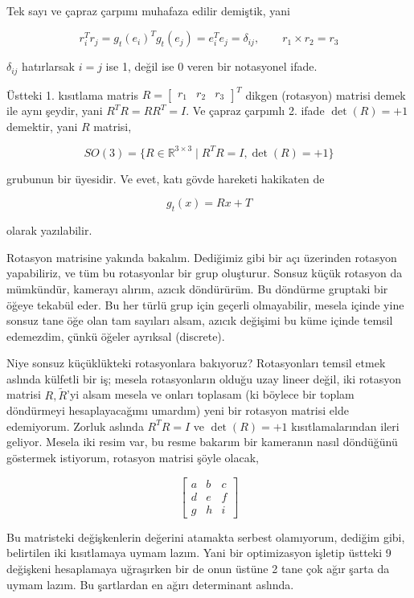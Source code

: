 \documentclass[12pt,fleqn]{article}\usepackage{../../common}
\begin{document}
Tek sayı ve çapraz çarpımı muhafaza edilir demiştik, yani

$$ r_i^Tr_j = g_t(e_i)^Tg_t(e_j) =
e_i^Te_j = \delta_{ij}, 
\qquad r_1 \times r_2 = r_3
$$

$\delta_{ij}$ hatırlarsak $i=j$ ise 1, değil ise 0 veren bir notasyonel ifade. 

Üstteki 1. kısıtlama matris $R = \left[\begin{array}{ccc} r_1&r_2&r_3 \end{array}\right]^T$ 
dikgen (rotasyon) matrisi demek ile aynı şeydir, yani $R^TR = RR^T = I$. Ve
çapraz  çarpımlı 2. ifade $\det(R) = +1$  demektir, yani $R$ matrisi, 

$$SO(3) = \{ R \in \mathbb{R}^{3 \times 3} \mid R^TR = I, \det(R) = +1\}$$

grubunun bir üyesidir. Ve evet, katı gövde hareketi hakikaten de 

$$ g_t(x) = Rx + T $$

olarak yazılabilir.

Rotasyon matrisine yakında bakalım. Dediğimiz gibi bir açı üzerinden
rotasyon yapabiliriz, ve tüm bu rotasyonlar bir grup oluşturur. Sonsuz
küçük rotasyon da mümkündür, kamerayı alırım, azıcık döndürürüm. Bu
döndürme gruptaki bir öğeye tekabül eder. Bu her türlü grup için geçerli
olmayabilir, mesela içinde yine sonsuz tane öğe olan tam sayıları alsam,
azıcık değişimi bu küme içinde temsil edemezdim, çünkü öğeler ayrıksal
(discrete). 

Niye sonsuz küçüklükteki rotasyonlara bakıyoruz?  Rotasyonları temsil etmek
aslında külfetli bir iş; mesela rotasyonların olduğu uzay lineer değil, iki
rotasyon matrisi $R,\tilde{R}$'yi alsam mesela ve onları toplasam (ki
böylece bir toplam döndürmeyi hesaplayacağımı umardım) yeni bir rotasyon
matrisi elde edemiyorum. Zorluk aslında $R^TR=I$ ve $\det(R)=+1$
kısıtlamalarından ileri geliyor. Mesela iki resim var, bu resme bakarım bir
kameranın nasıl döndüğünü göstermek istiyorum, rotasyon matrisi şöyle
olacak,

$$ 
\left[\begin{array}{rrr}
a & b & c \\ d & e & f \\ g & h & i
\end{array}\right]
 $$

Bu matristeki değişkenlerin değerini atamakta serbest olamıyorum,
dediğim gibi, belirtilen iki kısıtlamaya uymam lazım. Yani bir optimizasyon
işletip üstteki 9 değişkeni hesaplamaya uğraşırken bir de onun üstüne 2
tane çok ağır şarta da uymam lazım. Bu şartlardan en ağırı determinant
aslında. 
\end{document}
